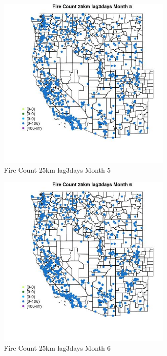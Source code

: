 \begin{figure} 
\centering  
\includegraphics[width=0.77\textwidth]{Code_Outputs/Report_ML_input_PM25_Step4_part_f_de_duplicated_aveswNAs_MapObsMo5Fire_Count_25km_lag3days.jpg} 
\caption{\label{fig:Report_ML_input_PM25_Step4_part_f_de_duplicated_aveswNAsMapObsMo5Fire_Count_25km_lag3days}Fire Count 25km lag3days Month 5} 
\end{figure} 
 

\begin{figure} 
\centering  
\includegraphics[width=0.77\textwidth]{Code_Outputs/Report_ML_input_PM25_Step4_part_f_de_duplicated_aveswNAs_MapObsMo6Fire_Count_25km_lag3days.jpg} 
\caption{\label{fig:Report_ML_input_PM25_Step4_part_f_de_duplicated_aveswNAsMapObsMo6Fire_Count_25km_lag3days}Fire Count 25km lag3days Month 6} 
\end{figure} 
 

